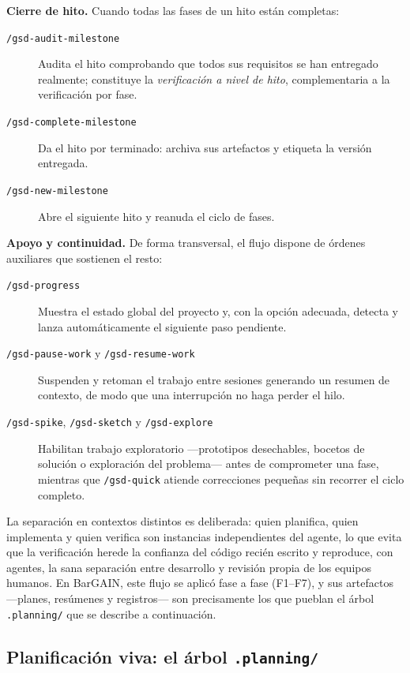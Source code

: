 \medskip\noindent\textbf{Cierre de hito.} Cuando todas las fases de un hito est\'an completas:
\begin{description}
  \item[\texttt{/gsd-audit-milestone}] Audita el hito comprobando que todos sus requisitos se han
    entregado realmente; constituye la \emph{verificaci\'on a nivel de hito}, complementaria a la
    verificaci\'on por fase.
  \item[\texttt{/gsd-complete-milestone}] Da el hito por terminado: archiva sus artefactos y
    etiqueta la versi\'on entregada.
  \item[\texttt{/gsd-new-milestone}] Abre el siguiente hito y reanuda el ciclo de fases.
\end{description}

\medskip\noindent\textbf{Apoyo y continuidad.} De forma transversal, el flujo dispone de \'ordenes
auxiliares que sostienen el resto:
\begin{description}
  \item[\texttt{/gsd-progress}] Muestra el estado global del proyecto y, con la opci\'on adecuada,
    detecta y lanza autom\'aticamente el siguiente paso pendiente.
  \item[\texttt{/gsd-pause-work} y \texttt{/gsd-resume-work}] Suspenden y retoman el trabajo entre
    sesiones generando un resumen de contexto, de modo que una interrupci\'on no haga perder el
    hilo.
  \item[\texttt{/gsd-spike}, \texttt{/gsd-sketch} y \texttt{/gsd-explore}] Habilitan trabajo
    exploratorio ---prototipos desechables, bocetos de soluci\'on o exploraci\'on del problema---
    antes de comprometer una fase, mientras que \texttt{/gsd-quick} atiende correcciones peque\~nas
    sin recorrer el ciclo completo.
\end{description}

La separaci\'on en contextos distintos es deliberada: quien planifica, quien implementa y quien
verifica son instancias independientes del agente, lo que evita que la verificaci\'on herede la
confianza del c\'odigo reci\'en escrito y reproduce, con agentes, la sana separaci\'on entre
desarrollo y revisi\'on propia de los equipos humanos. En BarGAIN, este flujo se aplic\'o fase a
fase (F1--F7), y sus artefactos ---planes, res\'umenes y registros--- son precisamente los que
pueblan el \'arbol \texttt{.planning/} que se describe a continuaci\'on.

\subsection{Planificaci\'on viva: el \'arbol \texttt{.planning/}}

